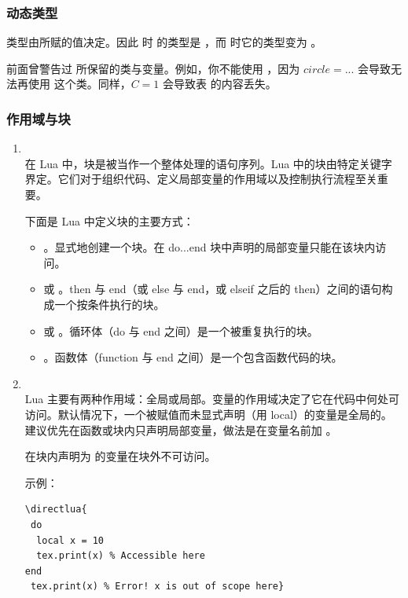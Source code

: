 \subsubsection{动态类型}

类型由所赋的值决定。因此  时  的类型是 ，而  时它的类型变为 。

\tkzRHand 前面曾警告过  所保留的类与变量。例如，你不能使用 ，因为 $circle = ...$ 会导致无法再使用  这个类。同样，$C= 1$ 会导致表  的内容丢失。

\subsubsection{作用域与块}

\begin{enumerate}

  \item  {}\\
在 Lua 中，块是被当作一个整体处理的语句序列。Lua 中的块由特定关键字界定。它们对于组织代码、定义局部变量的作用域以及控制执行流程至关重要。

下面是 Lua 中定义块的主要方式：

\begin{itemize}
  \item {}。显式地创建一个块。在 do...end 块中声明的局部变量只能在该块内访问。

  \item {} 或 。then 与 end（或 else 与 end，或 elseif 之后的 then）之间的语句构成一个按条件执行的块。

\item {} 或 。循环体（do 与 end 之间）是一个被重复执行的块。

\item {}。函数体（function 与 end 之间）是一个包含函数代码的块。
\end{itemize}


\item {}\\
Lua 主要有两种作用域：全局或局部。变量的作用域决定了它在代码中何处可访问。默认情况下，一个被赋值而未显式声明（用 local）的变量是全局的。建议优先在函数或块内只声明局部变量，做法是在变量名前加 。

在块内声明为  的变量在块外不可访问。

示例：

\begin{mybox}
\begin{verbatim}
\directlua{
 do
  local x = 10
  tex.print(x) % Accessible here
end
 tex.print(x) % Error! x is out of scope here}
\end{verbatim}
\end{mybox}
\end{enumerate}

